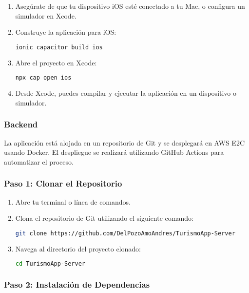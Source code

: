 \begin{enumerate}
	\item Asegúrate de que tu dispositivo iOS esté conectado a tu Mac, o configura un simulador en Xcode.
	\item Construye la aplicación para iOS:
	      \begin{lstlisting}[language=bash]
    ionic capacitor build ios
    \end{lstlisting}
	\item Abre el proyecto en Xcode:
	      \begin{lstlisting}[language=bash]
    npx cap open ios
    \end{lstlisting}
	\item Desde Xcode, puedes compilar y ejecutar la aplicación en un dispositivo o simulador.
\end{enumerate}

\subsubsection{Backend}

La aplicación está alojada en un repositorio de Git y se desplegará en AWS E2C usando Docker.
El despliegue se realizará utilizando GitHub Actions para automatizar el proceso.

\subsubsection{Paso 1: Clonar el Repositorio}

\begin{enumerate}
	\item Abre tu terminal o línea de comandos.
	\item Clona el repositorio de Git utilizando el siguiente comando:
	      \begin{lstlisting}[language=bash]
    git clone https://github.com/DelPozoAmoAndres/TurismoApp-Server
    \end{lstlisting}
	\item Navega al directorio del proyecto clonado:
	      \begin{lstlisting}[language=bash]
    cd TurismoApp-Server
    \end{lstlisting}
\end{enumerate}

\subsubsection{Paso 2: Instalación de Dependencias}

